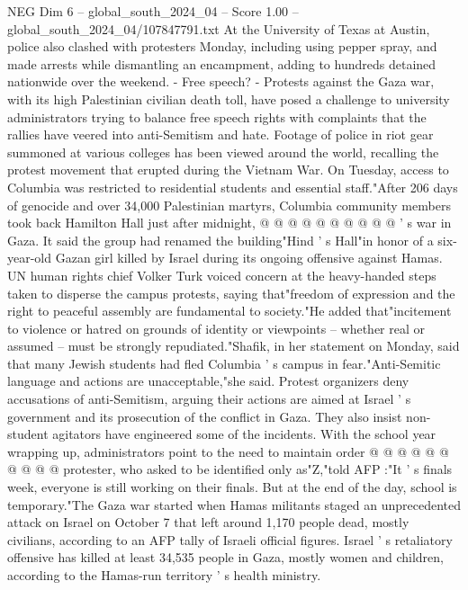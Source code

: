 \begin{textsample}{NEG Dim 6 – global\_south\_2024\_04 – Score 1.00 – global\_south\_2024\_04/107847791.txt}
At the University of Texas at Austin, police also clashed with protesters Monday, including using pepper spray, and made arrests while dismantling an encampment, adding to hundreds detained nationwide over the weekend. - Free speech? - Protests against the Gaza war, with its high Palestinian civilian death toll, have posed a challenge to university administrators trying to balance free speech rights with complaints that the rallies have veered into anti-Semitism and hate.
Footage of police in riot gear summoned at various colleges has been viewed around the world, recalling the protest movement that erupted during the Vietnam War.
On Tuesday, access to Columbia was restricted to residential students and essential staff."After 206 days of genocide and over 34,000 Palestinian martyrs, Columbia community members took back Hamilton Hall just after midnight, @ @ @ @ @ @ @ @ @ @ ' s war in Gaza.
It said the group had renamed the building"Hind ' s Hall"in honor of a six-year-old Gazan girl killed by Israel during its ongoing offensive against Hamas.
UN human rights chief Volker Turk voiced concern at the heavy-handed steps taken to disperse the campus protests, saying that"freedom of expression and the right to peaceful assembly are fundamental to society."He added that"incitement to violence or hatred on grounds of identity or viewpoints -- whether real or assumed -- must be strongly repudiated."Shafik, in her statement on Monday, said that many Jewish students had fled Columbia ' s campus in fear."Anti-Semitic language and actions are unacceptable,"she said.
Protest organizers deny accusations of anti-Semitism, arguing their actions are aimed at Israel ' s government and its prosecution of the conflict in Gaza.
They also insist non-student agitators have engineered some of the incidents.
With the school year wrapping up, administrators point to the need to maintain order @ @ @ @ @ @ @ @ @ @ protester, who asked to be identified only as"Z,"told AFP :"It ' s finals week, everyone is still working on their finals.
But at the end of the day, school is temporary."The Gaza war started when Hamas militants staged an unprecedented attack on Israel on October 7 that left around 1,170 people dead, mostly civilians, according to an AFP tally of Israeli official figures.
Israel ' s retaliatory offensive has killed at least 34,535 people in Gaza, mostly women and children, according to the Hamas-run territory ' s health ministry.

\end{textsample}
